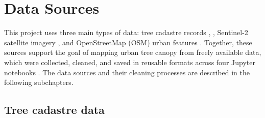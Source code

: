 \section{Data Sources}

This project uses three main types of data: tree cadastre records \cite{linzcadastre} \cite{baumkataster2025} \cite{innsbruckcadastre}, \cite{parisarbres} \cite{barcelonaarbrat} \cite{hamburgbaumkataster} , Sentinel-2 satellite imagery \cite{earthenginecodeeditor}, and OpenStreetMap (OSM) urban features \cite{geofabrikeurope}. Together, these sources support the goal of mapping urban tree canopy from freely available data, which were collected, cleaned, and saved in reusable formats across four Jupyter notebooks \cite{scraperbaumkataster} \cite{scrapersentinelosmnotebook} \cite{scrapermoredata}  \cite{scraperdatabase}. The data sources and their cleaning processes are described in the following subchapters.

\subsection{Tree cadastre data}

